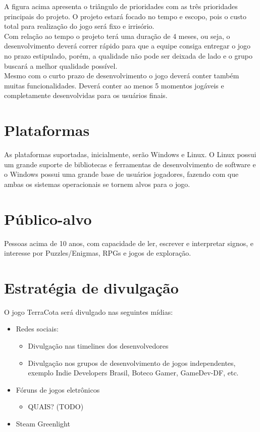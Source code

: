 \documentclass[a4paper,11pt]{article}
\begin{document}
A figura acima apresenta o triângulo de prioridades com as três prioridades principais do projeto. O projeto estará focado no tempo e escopo, pois o custo total para realização do jogo será fixo e irrisório. \\
Com relação ao tempo o projeto terá uma duração de 4 meses, ou seja, o desenvolvimento deverá correr rápido para que a equipe consiga entregar o jogo no prazo estipulado, porém, a qualidade não pode ser deixada de lado e o grupo buscará a melhor qualidade possível. \\
Mesmo com o curto prazo de desenvolvimento o jogo deverá conter também muitas funcionalidades. Deverá conter ao menos 5 momentos jogáveis e completamente desenvolvidas para os usuários finais.

\section{Plataformas}

As plataformas suportadas, inicialmente, serão Windows e Linux.
O Linux possui um grande suporte de bibliotecas e ferramentas de desenvolvimento de software e o Windows possui uma grande base de usuários jogadores, fazendo com que ambas os sistemas operacionais se tornem alvos para o jogo.


\section{Público-alvo}
Pessoas acima de 10 anos, com capacidade de ler, escrever e interpretar signos, e interesse por Puzzles/Enigmas, RPGs e jogos de exploração.

\section{Estratégia de divulgação}

O jogo TerraCota será divulgado nas seguintes mídias:
\begin{itemize}
  \item Redes sociais:
  \begin{itemize}
    \item Divulgação nas timelines dos desenvolvedores
    \item Divulgação nos grupos de desenvolvimento de jogos independentes, exemplo Indie Developers Brasil, Boteco Gamer, GameDev-DF, etc.
  \end{itemize}
  \item Fóruns de jogos eletrônicos
    \begin{itemize}
      \item QUAIS?	 (TODO)
  \end{itemize}
  \item Steam Greenlight
\end{itemize}
\end{document}
